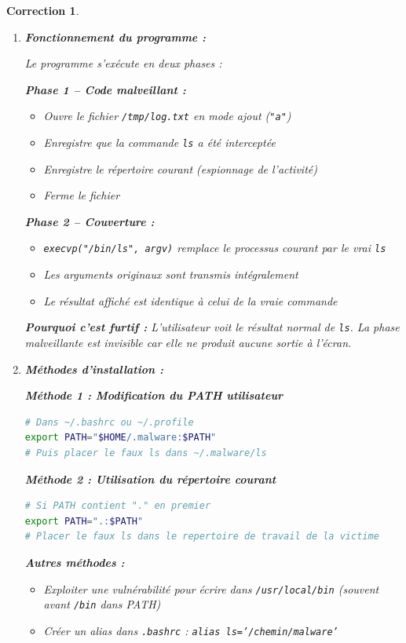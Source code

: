 \documentclass[a4paper,11pt]{article}
\theoremstyle{plain}
\newtheorem{correction}{Correction}
\theoremstyle{definition}
\begin{document}
\begin{correction}

\begin{enumerate}
\item \textbf{Fonctionnement du programme :}

Le programme s'exécute en deux phases :

\textbf{Phase 1 -- Code malveillant :}
\begin{itemize}
\item Ouvre le fichier \texttt{/tmp/log.txt} en mode ajout (\texttt{"a"})
\item Enregistre que la commande \texttt{ls} a été interceptée
\item Enregistre le répertoire courant (espionnage de l'activité)
\item Ferme le fichier
\end{itemize}

\textbf{Phase 2 -- Couverture :}
\begin{itemize}
\item \texttt{execvp("/bin/ls", argv)} remplace le processus courant par le vrai \texttt{ls}
\item Les arguments originaux sont transmis intégralement
\item Le résultat affiché est identique à celui de la vraie commande
\end{itemize}

\textbf{Pourquoi c'est furtif :} L'utilisateur voit le résultat normal de \texttt{ls}. La phase malveillante est invisible car elle ne produit aucune sortie à l'écran.

\item \textbf{Méthodes d'installation :}

\textbf{Méthode 1 : Modification du PATH utilisateur}
\begin{lstlisting}[language=bash,numbers=none]
# Dans ~/.bashrc ou ~/.profile
export PATH="$HOME/.malware:$PATH"
# Puis placer le faux ls dans ~/.malware/ls
\end{lstlisting}

\textbf{Méthode 2 : Utilisation du répertoire courant}
\begin{lstlisting}[language=bash,numbers=none]
# Si PATH contient "." en premier
export PATH=".:$PATH"
# Placer le faux ls dans le repertoire de travail de la victime
\end{lstlisting}

\textbf{Autres méthodes :}
\begin{itemize}
\item Exploiter une vulnérabilité pour écrire dans \texttt{/usr/local/bin} (souvent avant \texttt{/bin} dans PATH)
\item Créer un alias dans \texttt{.bashrc} : \texttt{alias ls='/chemin/malware'}
\end{itemize}


\end{enumerate}
\end{correction}
\end{document}

